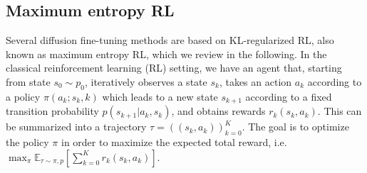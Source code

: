 \documentclass[]{fairmeta}
\begin{document}
\subsection{Maximum entropy RL}
Several diffusion fine-tuning methods \citep{black2024training,uehara2024finetuning} are based on KL-regularized RL, also known as maximum entropy RL, which we review in the following.
In the classical reinforcement learning (RL) setting, we have an agent that, starting from state $s_0 \sim p_0$, iteratively observes a state $s_k$, takes an action $a_k$ according to a policy $\pi(a_k;s_k,k)$ which leads to a new state $s_{k+1}$ according to a fixed transition probability $p(s_{k+1}|a_k,s_k)$, and obtains rewards $r_k(s_k,a_k)$. 
This can be summarized into a trajectory $\tau = ((s_k,a_k))_{k=0}^{K}$. 
The goal is to optimize the policy $\pi$ in order to maximize the expected total reward, i.e. $\max_{\pi} \mathbb{E}_{\tau \sim \pi,p} [\sum_{k=0}^{K} r_k(s_k,a_k)
]$. 

\end{document}
